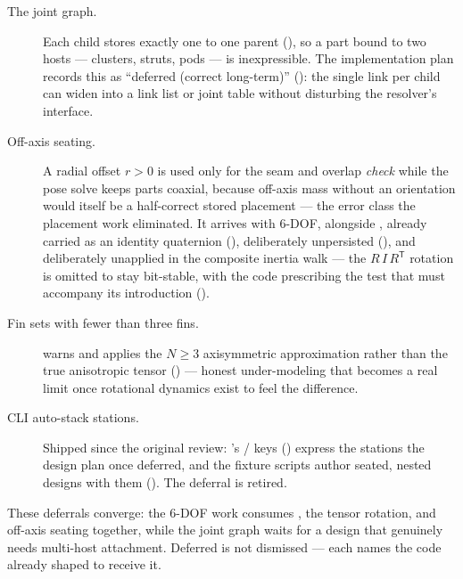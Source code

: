 \begin{description}

  \item[The joint graph.] Each child stores exactly one  to one parent
  (), so a part bound to two hosts --- clusters, struts, pods --- is
  inexpressible. The implementation plan records this as ``deferred (correct long-term)''
  (): the single link per child can widen
  into a link list or joint table without disturbing the resolver's interface.

  \item[Off-axis seating.] A radial offset $r>0$ is used only for the seam and overlap
  \emph{check} while the pose solve keeps parts coaxial, because off-axis mass without an
  orientation would itself be a half-correct stored placement --- the error class the placement
  work eliminated. It arrives with 6-DOF, alongside , already carried
  as an identity quaternion (), deliberately unpersisted
  (), and deliberately unapplied in the composite inertia walk
  --- the $R\,I\,R^{\mathsf{T}}$ rotation is omitted to stay bit-stable, with the code prescribing
  the test that must accompany its introduction ().

  \item[Fin sets with fewer than three fins.]  warns and applies the $N \ge 3$
  axisymmetric approximation rather than the true anisotropic tensor
  () --- honest under-modeling that becomes a real limit once
  rotational dynamics exist to feel the difference.

  \item[CLI auto-stack stations.] Shipped since the original review: 's
  / keys () express the stations
  the design plan once deferred, and the fixture scripts author seated, nested designs with them
  (). The deferral is retired.

\end{description}

\noindent These deferrals converge: the 6-DOF work consumes , the tensor rotation,
and off-axis seating together, while the joint graph waits for a design that genuinely needs
multi-host attachment. Deferred is not dismissed --- each names the code already shaped to receive
it.

